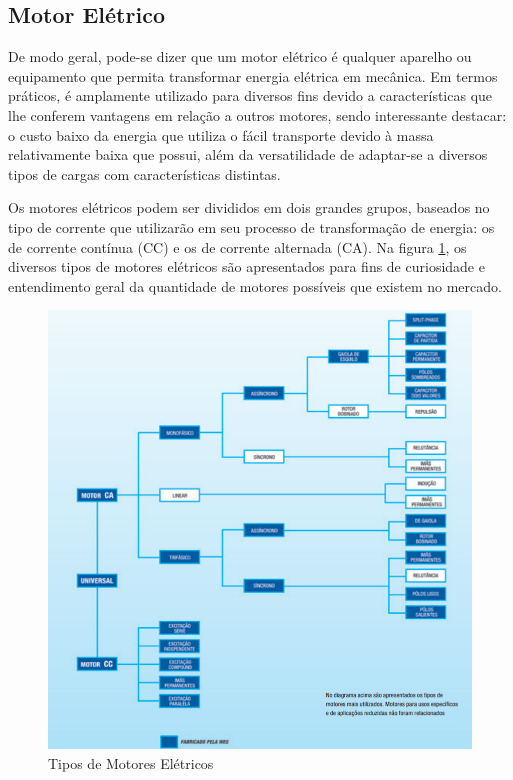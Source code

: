 	\subsection{Motor Elétrico}
De modo geral, pode-se dizer que um motor elétrico é qualquer aparelho ou equipamento que permita transformar energia elétrica em mecânica. Em termos práticos, é amplamente utilizado para diversos fins devido a características que lhe conferem vantagens em relação a outros motores, sendo interessante destacar: o custo baixo da energia que utiliza o fácil transporte devido à massa relativamente baixa que possui, além da versatilidade de adaptar-se a diversos tipos de cargas com características distintas.

Os motores elétricos podem ser divididos em dois grandes grupos, baseados no tipo de corrente que utilizarão em seu processo de transformação de energia: os de corrente contínua (CC) e os de corrente alternada (CA). Na figura \ref{img:tipos_motores}, os diversos tipos de motores elétricos são apresentados para fins de curiosidade e entendimento geral da quantidade de motores possíveis que existem no mercado.	

\graphicspath{{figuras/}}
\begin{figure}[h]
\centering
\includegraphics[scale=0.80]{tipos_motores.png}
\caption{Tipos de Motores Elétricos}
\label{img:tipos_motores}
\end{figure}

